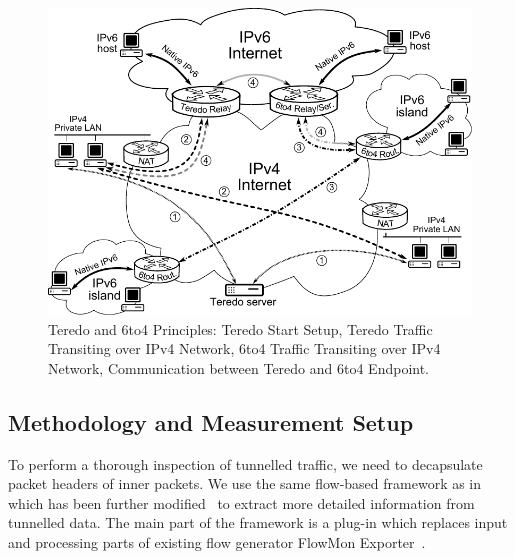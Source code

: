 \begin{figure}[!tb]
        \centering
        \includegraphics{figures/paper-tunnels/tunely-schema}
        \caption{Teredo and 6to4 Principles:  Teredo Start Setup,  Teredo Traffic Transiting over IPv4 Network,  6to4 Traffic Transiting over IPv4 Network,  Communication between Teredo and 6to4 Endpoint.}
        \label{fig:ipv6-tunnels-monitoring-schema}
\end{figure}


\subsection{Methodology and Measurement Setup} \label{subsec:ipv6-tunnels-met-mon-setup}

To perform a thorough inspection of tunnelled traffic, we need to decapsulate packet headers of inner packets. We use the same flow-based framework as in~\cite{Elich-2011-Monitoring} which has been further modified~\cite{Elich-2013-FlowMon} to extract more detailed information from tunnelled data. The main part of the framework is a plug-in which replaces input and processing parts of existing flow generator FlowMon Exporter~\cite{FlowmonNetworks--Flowmon}. 

